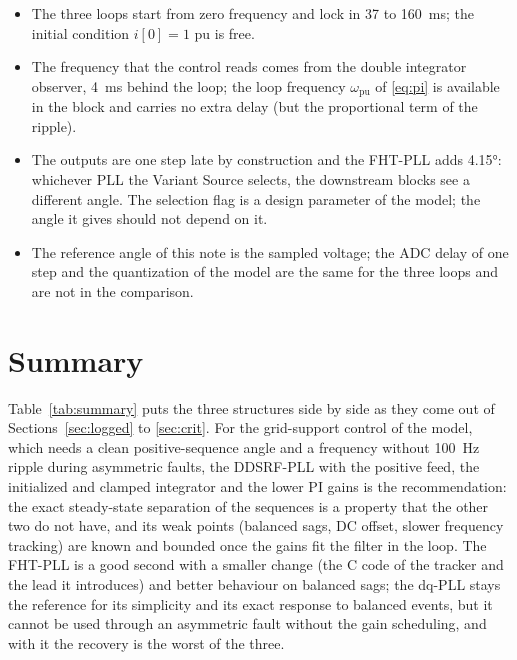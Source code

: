 \documentclass[11pt,a4paper]{scrartcl}
\newcommand{\ped}[1]{_{\mathrm{#1}}}
\begin{document}
\begin{onehalfspace}
\begin{itemize}[nosep]
	\item The three loops start from zero frequency and lock in \SI{37}{} to \SI{160}{\milli\second}; the initial condition $i[0] = 1$ pu is free.
	\item The frequency that the control reads comes from the double integrator observer, \SI{4}{\milli\second} behind the loop; the loop frequency $\omega\ped{pu}$ of \eqref{eq:pi} is available in the block and carries no extra delay (but the proportional term of the ripple).
	\item The outputs are one step late by construction and the FHT-PLL adds \ang{4.15}: whichever PLL the Variant Source selects, the downstream blocks see a different angle. The selection flag is a design parameter of the model; the angle it gives should not depend on it.
	\item The reference angle of this note is the sampled voltage; the ADC delay of one step and the quantization of the model are the same for the three loops and are not in the comparison.
\end{itemize}

\section{Summary}
\label{sec:summary}

Table~\ref{tab:summary} puts the three structures side by side as they come out of Sections~\ref{sec:logged} to \ref{sec:crit}. For the grid-support control of the model, which needs a clean positive-sequence angle and a frequency without \SI{100}{\hertz} ripple during asymmetric faults, the DDSRF-PLL with the positive feed, the initialized and clamped integrator and the lower PI gains is the recommendation: the exact steady-state separation of the sequences is a property that the other two do not have, and its weak points (balanced sags, DC offset, slower frequency tracking) are known and bounded once the gains fit the filter in the loop. The FHT-PLL is a good second with a smaller change (the C code of the tracker and the lead it introduces) and better behaviour on balanced sags; the dq-PLL stays the reference for its simplicity and its exact response to balanced events, but it cannot be used through an asymmetric fault without the gain scheduling, and with it the recovery is the worst of the three.


\end{onehalfspace}
\end{document}
